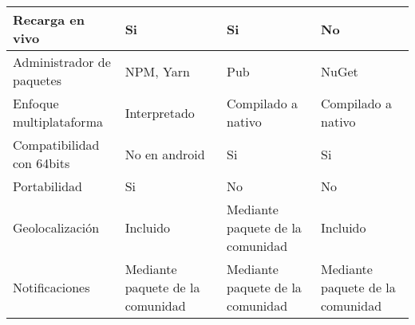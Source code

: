 \begin{longtable}{|p{5cm}|p{3cm}|p{3cm}|p{3cm}|}
    Recarga en vivo                                & Si                                                        & Si                                                                                                             & No                                                                                                                           \\\hline
    Administrador de paquetes                      & NPM, Yarn                                                 & Pub                                                                                                            & NuGet                                                                                                                        \\\hline
    Enfoque multiplataforma                        & Interpretado                                              & Compilado a nativo                                                                                             & Compilado a nativo                                                                                                           \\\hline
    Compatibilidad con 64bits                      & No en android                                             & Si                                                                                                             & Si                                                                                                                           \\\hline
    Portabilidad                                   & Si                                                        & No                                                                                                             & No                                                                                                                           \\\hline
    Geolocalización                                & Incluido                                                  & Mediante paquete de la comunidad                                                                               & Incluido                                                                                                                     \\\hline
    Notificaciones                                 & Mediante paquete de la comunidad                          & Mediante paquete de la comunidad                                                                               & Mediante paquete de la comunidad                                                                                             \\\hline

\end{longtable}
